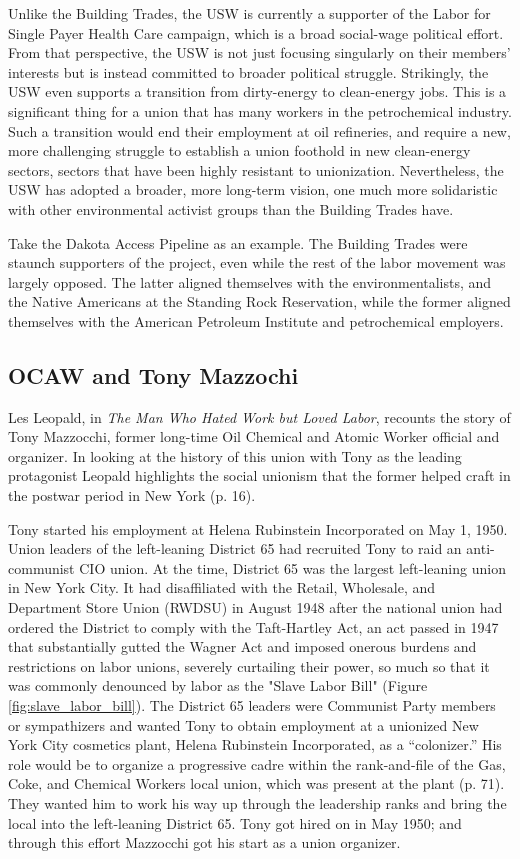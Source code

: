 Unlike the Building Trades, the USW is currently a supporter of the Labor for Single Payer Health Care campaign, which is a broad social-wage political effort. From that perspective, the USW is not just focusing singularly on their members’ interests but is instead committed to broader political struggle. Strikingly, the USW even supports a transition from dirty-energy to clean-energy jobs. This is a significant thing for a union that has many workers in the petrochemical industry. Such a transition would end their employment at oil refineries, and require a new, more challenging struggle to establish a union foothold in new clean-energy sectors, sectors that have been highly resistant to unionization. Nevertheless, the USW has adopted a broader, more long-term vision, one much more solidaristic with other environmental activist groups than the Building Trades have.

Take the Dakota Access Pipeline as an example. The Building Trades were staunch supporters of the project, even while the rest of the labor movement was largely opposed. The latter aligned themselves with the environmentalists, and the Native Americans at the Standing Rock Reservation, while the former aligned themselves with the American Petroleum Institute and petrochemical employers.

\subsection{OCAW and Tony Mazzochi}

Les Leopald, in \textit{The Man Who Hated Work but Loved Labor}, recounts the story of Tony Mazzocchi, former long-time Oil Chemical and Atomic Worker official and organizer. In looking at the history of this union with Tony as the leading protagonist Leopald highlights the social unionism that the former helped craft in the postwar period in New York (p. 16).

Tony started his employment at Helena Rubinstein Incorporated on May 1, 1950. Union leaders of the left-leaning District 65 had recruited Tony to raid an anti-communist CIO union. At the time, District 65 was the largest left-leaning union in New York City. It had disaffiliated with the Retail, Wholesale, and Department Store Union (RWDSU) in August 1948 after the national union had ordered the District to comply with the Taft-Hartley Act, an act passed in 1947 that substantially gutted the Wagner Act  and imposed onerous burdens and restrictions on labor unions, severely curtailing their power, so much so that it was commonly denounced by labor as the "Slave Labor Bill" (Figure \ref{fig:slave_labor_bill}). The District 65 leaders were Communist Party members or sympathizers and wanted Tony to obtain employment at a unionized New York City cosmetics plant, Helena Rubinstein Incorporated, as a “colonizer.” His role would be to organize a progressive cadre within the rank-and-file of the Gas, Coke, and Chemical Workers local union, which was present at the plant (p. 71). They wanted him to work his way up through the leadership ranks and bring the local into the left-leaning District 65. Tony got hired on in May 1950; and through this effort Mazzocchi got his start as a union organizer.

